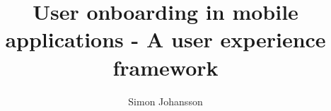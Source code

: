 \documentclass[runningheads, a4paper, oribibl]{config/llncs}
\begin{document}
\pagestyle{headings}

\mainmatter

\title{User onboarding in mobile applications - A user experience framework
}

\author{Simon Johansson}


\maketitle

\begin{abstract}
  
\end{abstract}


%


\end{document}
